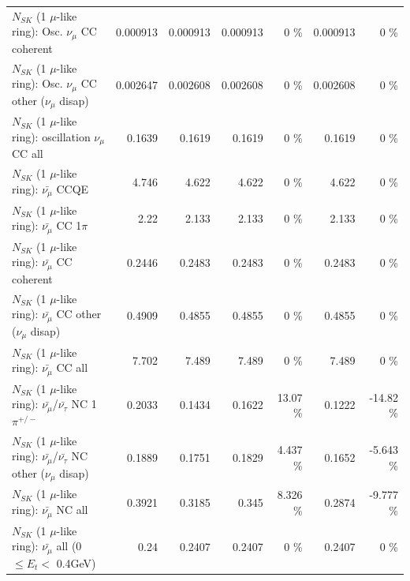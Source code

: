 \begin{table}
\begin{tabular}{| l | r | r | r  r | r  r |}
                        $N_{SK}$ (1 $\mu$-like ring): Osc. $\nu_\mu$ CC coherent &        0.000913 &        0.000913 &        0.000913 &        0 \%  &        0.000913 &        0 \%  \\ 
         $N_{SK}$ (1 $\mu$-like ring): Osc. $\nu_\mu$ CC other ($\nu_\mu$ disap) &        0.002647 &        0.002608 &        0.002608 &        0 \%  &        0.002608 &        0 \%  \\ 
                      $N_{SK}$ (1 $\mu$-like ring): oscillation $\nu_\mu$ CC all &          0.1639 &          0.1619 &          0.1619 &        0 \%  &          0.1619 &        0 \%  \\ 
\hline
\hline
                              $N_{SK}$ (1 $\mu$-like ring): $\bar{\nu_\mu}$ CCQE &           4.746 &           4.622 &           4.622 &        0 \%  &           4.622 &        0 \%  \\ 
                         $N_{SK}$ (1 $\mu$-like ring): $\bar{\nu_\mu}$ CC 1$\pi$ &            2.22 &           2.133 &           2.133 &        0 \%  &           2.133 &        0 \%  \\ 
                       $N_{SK}$ (1 $\mu$-like ring): $\bar{\nu_\mu}$ CC coherent &          0.2446 &          0.2483 &          0.2483 &        0 \%  &          0.2483 &        0 \%  \\ 
        $N_{SK}$ (1 $\mu$-like ring): $\bar{\nu_\mu}$ CC other ($\nu_\mu$ disap) &          0.4909 &          0.4855 &          0.4855 &        0 \%  &          0.4855 &        0 \%  \\ 
                          $N_{SK}$ (1 $\mu$-like ring): $\bar{\nu_{\mu}}$ CC all &           7.702 &           7.489 &           7.489 &        0 \%  &           7.489 &        0 \%  \\ 
\hline
  $N_{SK}$ (1 $\mu$-like ring): $\bar{\nu_\mu}$/$\bar{\nu_\tau}$ NC 1$\pi^{+/-}$ &          0.2033 &          0.1434 &          0.1622 &    13.07 \%  &          0.1222 &   -14.82 \%  \\ 
$N_{SK}$ (1 $\mu$-like ring): $\bar{\nu_\mu}$/$\bar{\nu_\tau}$ NC other ($\nu_\mu$ disap) &          0.1889 &          0.1751 &          0.1829 &    4.437 \%  &          0.1652 &   -5.643 \%  \\ 
                          $N_{SK}$ (1 $\mu$-like ring): $\bar{\nu_{\mu}}$ NC all &          0.3921 &          0.3185 &           0.345 &    8.326 \%  &          0.2874 &   -9.777 \%  \\ 
\hline
   $N_{SK}$ (1 $\mu$-like ring): $\bar{\nu_{\mu}}$ all (0 $\leq E_{t} <$ 0.4GeV) &            0.24 &          0.2407 &          0.2407 &        0 \%  &          0.2407 &        0 \%  \\ 

\end{tabular}
\end{table}
